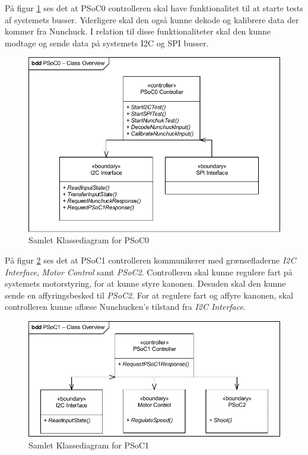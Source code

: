 På figur \ref{fig:CompleteClassDiagramPSoC0} ses det at PSoC0 controlleren skal have funktionalitet til at starte tests af systemets busser. Yderligere skal den også kunne dekode og kalibrere data der kommer fra Nunchuck. I relation til disse funktionaliteter skal den kunne modtage og sende data på systemets I2C og SPI busser.
\begin{figure}[H]
	\centering
	\includegraphics[width=\textwidth] {Systemarkitektur/images/CompleteClassDiagramPSoC0}
	\caption{Samlet Klassediagram for PSoC0}
	\label{fig:CompleteClassDiagramPSoC0}
\end{figure}

På figur \ref{fig:CompleteClassDiagramPSoC1} ses det at PSoC1 controlleren kommunikerer med grænsefladerne \textit{I2C Interface}, \textit{Motor Control} samt \textit{PSoC2}. Controlleren skal kunne regulere fart på systemets motorstyring, for at kunne styre kanonen. Desuden skal den kunne sende en affyringsbesked til \textit{PSoC2}. For at regulere fart og affyre kanonen, skal controlleren kunne aflæse Nunchucken's tilstand fra \textit{I2C Interface}.
\begin{figure}[H]
	\centering
	\includegraphics[width=\textwidth] {Systemarkitektur/images/CompleteClassDiagramPSoC1}
	\caption{Samlet Klassediagram for PSoC1}
	\label{fig:CompleteClassDiagramPSoC1}
\end{figure}

